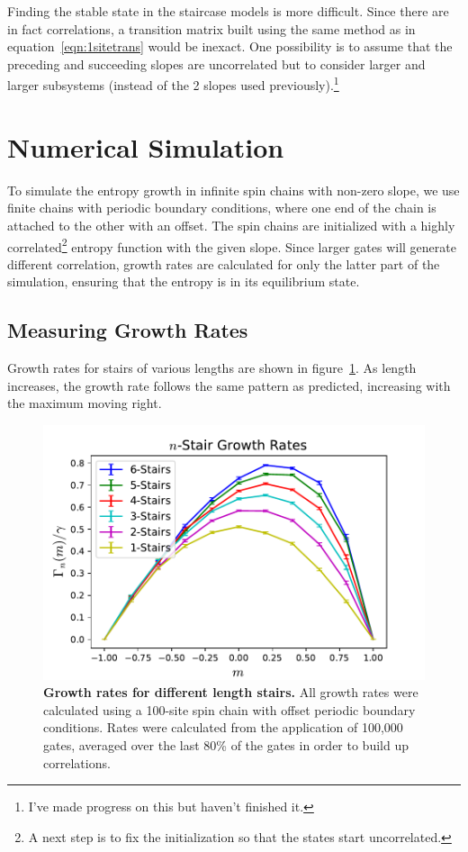 \documentclass[11pt]{article}
\begin{document}
Finding the stable state in the staircase models is more difficult. Since there are in fact correlations, a transition matrix built using the same method as in equation~\ref{eqn:1sitetrans} would be inexact. One possibility is to assume that the preceding and succeeding slopes are uncorrelated but to consider larger and larger subsystems (instead of the 2 slopes used previously).\footnote{I've made progress on this but haven't finished it.}

\section{Numerical Simulation} \label{sec:num}

To simulate the entropy growth in infinite spin chains with non-zero slope, we use finite chains with periodic boundary conditions, where one end of the chain is attached to the other with an offset. The spin chains are initialized with a highly correlated\footnote{A next step is to fix the initialization so that the states start uncorrelated.} entropy function with the given slope. Since larger gates will generate different correlation, growth rates are calculated for only the latter part of the simulation, ensuring that the entropy is in its equilibrium state.

\subsection{Measuring Growth Rates} \emph{} \label{sub:growthrates}

Growth rates for stairs of various lengths are shown in figure~\ref{fig:compareRates}. As length increases, the growth rate follows the same pattern as predicted, increasing with the maximum moving right. 
\begin{figure}
	\centering
	\includegraphics[width=.5\textwidth]{compareRates.pdf}
	\caption{\textbf{Growth rates for different length stairs.} All growth rates were calculated using a 100-site spin chain with offset periodic boundary conditions. Rates were calculated from the application of 100,000 gates, averaged over the last 80\% of the gates in order to build up correlations.}
	\label{fig:compareRates}
\end{figure}
\end{document}

